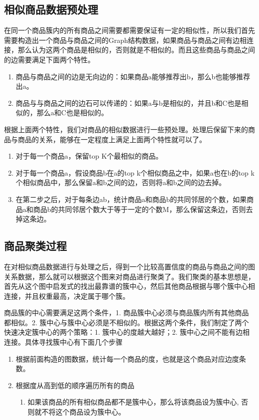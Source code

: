 \subsection{相似商品数据预处理}
在同一个商品簇内的所有商品之间需要都需要保证有一定的相似性，所以我们首先需要构造出一个商品与商品之间的Graph结构数据，如果商品与商品之间有边相连接，那么认为这两个商品是相似的，否则就是不相似的。而且这些商品与商品之间的边需要满足下面两个特性。
\begin{enumerate}
\item 商品与商品之间的边是无向边的：如果商品a能够推荐出b，那么b也能够推荐出a。 
\item 商品与与商品之间的边石可以传递的：如果a与b是相似的，并且b和C也是相似的，那么a和C也是相似的。 
\end{enumerate}
根据上面两个特性，我们对商品的相似数据进行一些预处理。处理后保留下来的商品与商品的关系，能够在一定程度上满足上面两个特性就可以了。
\begin{enumerate}
\item 对于每一个商品a，保留top K个最相似的商品。
\item 对于每一个商品a，假设商品b在a的top k个相似商品之中，如果a也在b的top k个相似商品中，那么保留a和b之间的边，否则将a和b之间的边去掉。
\item 在第二步之后，对于每条边ab，统计商品a和商品b的共同邻居的个数，如果商品a和商品b的共同邻居个数大于等于一定的个数M，那么保留这条边，否则去掉这条边。
\end{enumerate}

\subsection{商品聚类过程}
在对相似商品数据进行与处理之后，得到一个比较高置信度的商品与商品之间的图关系数据，那么就可以根据这个图来对商品进行聚类了。我们聚类的基本思想是，首先从这个图中启发式的找出最靠谱的簇中心，然后其他商品根据与哪个簇中心相连接，并且权重最高，决定属于哪个簇。

商品簇的中心需要满足这两个条件，1. 商品簇中心必须与商品簇内所有其他商品都相似。2. 簇中心与簇中心必须是不相似的。根据这两个条件，我们制定了两个快速决定簇中心的两个策略：1. 簇中心的度越大越好；2. 簇中心之间不能有边相连接。具体寻找簇中心有下面几个步骤

\begin{enumerate}
\item 根据前面构造的图数据，统计每一个商品的度，也就是这个商品对应边度条数。
\item 根据度从高到低的顺序遍历所有的商品
\begin{enumerate}
\item 如果该商品的所有相似商品都不是簇中心，那么将该商品设为簇中心, 否则就不将这个商品设为簇中心。
\end{enumerate}
\end{enumerate}

